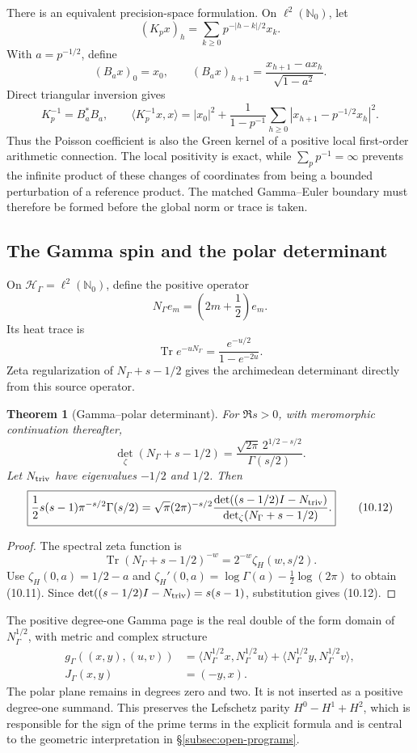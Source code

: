 \documentclass[11pt]{amsart}
\newtheorem{theorem}{Theorem}[section]
\theoremstyle{definition}
\theoremstyle{remark}
\DeclareMathOperator{\Tr}{Tr}
\begin{document}
There is an equivalent precision-space formulation.  On
\(\ell^2(\mathbb N_0)\), let
\[
 (K_px)_{h}=\sum_{k\ge0}p^{-|h-k|/2}x_k.
\]
With \(a=p^{-1/2}\), define
\[
 (B_ax)_0=x_0,
 \qquad
 (B_ax)_{h+1}=\frac{x_{h+1}-ax_h}{\sqrt{1-a^2}}.
\tag{10.8g}
\]
Direct triangular inversion gives
\[
 \boxed{
 K_p^{-1}=B_a^*B_a,
 \qquad
 \langle K_p^{-1}x,x\rangle
 =|x_0|^2+\frac1{1-p^{-1}}
  \sum_{h\ge0}|x_{h+1}-p^{-1/2}x_h|^2.}
\tag{10.8h}
\]
Thus the Poisson coefficient is also the Green kernel of a positive local
first-order arithmetic connection.  The local positivity is exact, while
\(\sum_p p^{-1}=\infty\) prevents the infinite product of these changes of
coordinates from being a bounded perturbation of a reference product.
The matched Gamma--Euler boundary must therefore be formed before the
global norm or trace is taken.

\subsection{The Gamma spin and the polar determinant}

On \(\mathcal H_\Gamma=\ell^2(\mathbb N_0)\), define the positive operator
\[
 N_\Gamma e_m=\left(2m+\frac12\right)e_m.
\tag{10.9}
\]
Its heat trace is
\[
 \Tr e^{-uN_\Gamma}=\frac{e^{-u/2}}{1-e^{-2u}}.
\tag{10.10}
\]
Zeta regularization of \(N_\Gamma+s-1/2\) gives the archimedean
determinant directly from this source operator.

\begin{theorem}[Gamma--polar determinant]
\label{thm:gamma-polar-det}
For \(\Re s>0\), with meromorphic continuation thereafter,
\[
 \det_\zeta(N_\Gamma+s-1/2)
 =\frac{\sqrt{2\pi}\,2^{1/2-s/2}}{\Gamma(s/2)}.
\tag{10.11}
\]
Let \(N_{\rm triv}\) have eigenvalues \(-1/2\) and \(1/2\).  Then
\[
 \boxed{
 \frac12s(s-1)\pi^{-s/2}\Gamma(s/2)
 =\sqrt\pi(2\pi)^{-s/2}
 \frac{\det((s-1/2)I-N_{\rm triv})}
      {\det_\zeta(N_\Gamma+s-1/2)}.}
\tag{10.12}
\]
\end{theorem}

\begin{proof}
The spectral zeta function is
\[
 \Tr(N_\Gamma+s-1/2)^{-w}
 =2^{-w}\zeta_H(w,s/2).
\]
Use
\(\zeta_H(0,a)=1/2-a\) and
\(\zeta_H'(0,a)=\log\Gamma(a)-\frac12\log(2\pi)\) to obtain
(10.11).  Since
\(\det((s-1/2)I-N_{\rm triv})=s(s-1)\), substitution gives
(10.12).
\end{proof}

The positive degree-one Gamma page is the real double of the form domain
of \(N_\Gamma^{1/2}\), with metric and complex structure
\[
 \begin{aligned}
 g_\Gamma((x,y),(u,v))
 &=\langle N_\Gamma^{1/2}x,N_\Gamma^{1/2}u\rangle
  +\langle N_\Gamma^{1/2}y,N_\Gamma^{1/2}v\rangle,\\
 J_\Gamma(x,y)&=(-y,x).
 \end{aligned}
\tag{10.13}
\]
The polar plane remains in degrees zero and two.  It is not inserted as a
positive degree-one summand.  This preserves the Lefschetz parity
\(H^0-H^1+H^2\), which is responsible for the sign of the prime terms in
the explicit formula and is central to the geometric interpretation in
\S\ref{subsec:open-programs}.
\end{document}
